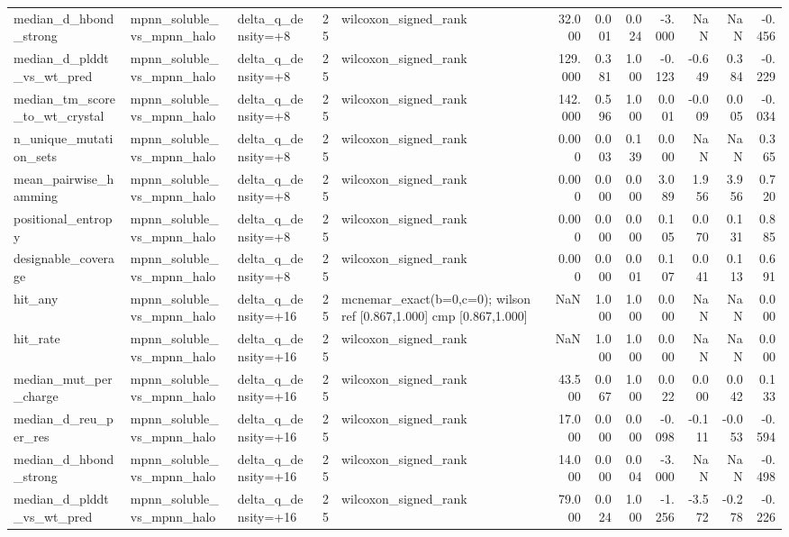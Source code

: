 \begin{table}
{\begin{tabular}{lllrlrrrrrrr}
median\_d\_hbond\_strong & mpnn\_soluble\_vs\_mpnn\_halo & delta\_q\_density=+8 & 25 & wilcoxon\_signed\_rank & 32.000 & 0.001 & 0.024 & -3.000 & NaN & NaN & -0.456 \\
median\_d\_plddt\_vs\_wt\_pred & mpnn\_soluble\_vs\_mpnn\_halo & delta\_q\_density=+8 & 25 & wilcoxon\_signed\_rank & 129.000 & 0.381 & 1.000 & -0.123 & -0.649 & 0.384 & -0.229 \\
median\_tm\_score\_to\_wt\_crystal & mpnn\_soluble\_vs\_mpnn\_halo & delta\_q\_density=+8 & 25 & wilcoxon\_signed\_rank & 142.000 & 0.596 & 1.000 & 0.001 & -0.009 & 0.005 & -0.034 \\
n\_unique\_mutation\_sets & mpnn\_soluble\_vs\_mpnn\_halo & delta\_q\_density=+8 & 25 & wilcoxon\_signed\_rank & 0.000 & 0.003 & 0.139 & 0.000 & NaN & NaN & 0.365 \\
mean\_pairwise\_hamming & mpnn\_soluble\_vs\_mpnn\_halo & delta\_q\_density=+8 & 25 & wilcoxon\_signed\_rank & 0.000 & 0.000 & 0.000 & 3.089 & 1.956 & 3.956 & 0.720 \\
positional\_entropy & mpnn\_soluble\_vs\_mpnn\_halo & delta\_q\_density=+8 & 25 & wilcoxon\_signed\_rank & 0.000 & 0.000 & 0.000 & 0.105 & 0.070 & 0.131 & 0.885 \\
designable\_coverage & mpnn\_soluble\_vs\_mpnn\_halo & delta\_q\_density=+8 & 25 & wilcoxon\_signed\_rank & 0.000 & 0.000 & 0.001 & 0.107 & 0.041 & 0.113 & 0.691 \\
hit\_any & mpnn\_soluble\_vs\_mpnn\_halo & delta\_q\_density=+16 & 25 & mcnemar\_exact(b=0,c=0); wilson ref [0.867,1.000] cmp [0.867,1.000] & NaN & 1.000 & 1.000 & 0.000 & NaN & NaN & 0.000 \\
hit\_rate & mpnn\_soluble\_vs\_mpnn\_halo & delta\_q\_density=+16 & 25 & wilcoxon\_signed\_rank & NaN & 1.000 & 1.000 & 0.000 & NaN & NaN & 0.000 \\
median\_mut\_per\_charge & mpnn\_soluble\_vs\_mpnn\_halo & delta\_q\_density=+16 & 25 & wilcoxon\_signed\_rank & 43.500 & 0.067 & 1.000 & 0.022 & 0.000 & 0.042 & 0.133 \\
median\_d\_reu\_per\_res & mpnn\_soluble\_vs\_mpnn\_halo & delta\_q\_density=+16 & 25 & wilcoxon\_signed\_rank & 17.000 & 0.000 & 0.000 & -0.098 & -0.111 & -0.053 & -0.594 \\
median\_d\_hbond\_strong & mpnn\_soluble\_vs\_mpnn\_halo & delta\_q\_density=+16 & 25 & wilcoxon\_signed\_rank & 14.000 & 0.000 & 0.004 & -3.000 & NaN & NaN & -0.498 \\
median\_d\_plddt\_vs\_wt\_pred & mpnn\_soluble\_vs\_mpnn\_halo & delta\_q\_density=+16 & 25 & wilcoxon\_signed\_rank & 79.000 & 0.024 & 1.000 & -1.256 & -3.572 & -0.278 & -0.226 \\

\end{tabular}}
\end{table}
